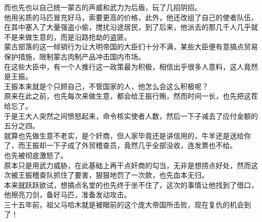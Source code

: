 \begin{multicols}{\theparacolNo}
而也先也以自己统一蒙古的声威和武力为后盾，玩了几招阴招。\\

他用劣质的马匹冒充好马，索要更高的价格，此外，他还改组了自己的使者队伍，在其中塞入了大量强盗小偷，搅扰沿途居民，到了后来，他派去的那几千人几乎就不是来做生意的，而是沿路抢劫的盗匪。\\

蒙古部落的这一倾销行为让大明帝国的大臣们十分不满，某些大臣便有意搞点贸易保护措施，限制蒙古肉制产品冲击国内市场。\\

在这些大臣中，有一个人推行这一政策最为积极，相信出乎很多人意料，这人竟然是王振。\\

王振本来就是个只顾自己，不管国家的人，他怎么会这么积极呢？\\

原来在此之前，也先每次来做生意，都会给王振行贿，然而时间一长，也先把这茬给忘了。\\

于是王大人突然之间愤怒起来，命令核实使者人数，然后一下子减去了应付金额的五分之四。\\

就算也先做生意不老实，是个奸商，但人家毕竟还是讲信用的，牛羊还是送给你了，而王振却一下子成了外贸稽查员，竟然几乎全部没收，连发票也不给。\\

也先被彻底激怒了。\\

原本只是用武力威胁，在此基础上再干点奸商的勾当，无非是想捞点好处，然而这次被王振稽查队抓住了要害，狠狠地罚了一次款，也先血本无归。\\

本来就跃跃欲试，想搞点名堂的也先终于坐不住了，这次的事情让他找到了借口，他擦亮刀剑，备好马匹，准备发动攻击。\\

三十五年前，祖父马哈木就是被眼前的这个庞大帝国所击败，现在复仇的机会到了！\\
\ifnum{}
	\end{multicols}
\fi
\newpage
